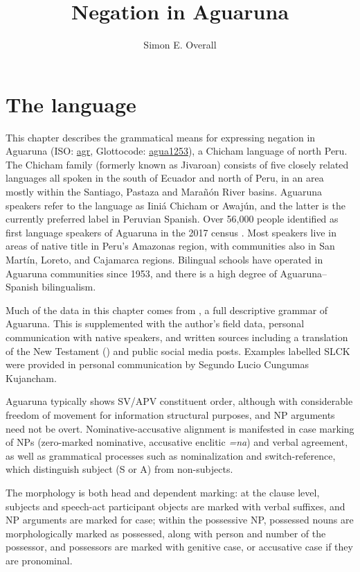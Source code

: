 \documentclass[output=paper,colorlinks,citecolor=brown,draft]{langscibook}
\author{Simon E. Overall\affiliation{University of Otago}}
\title{Negation in Aguaruna}
\begin{document}
\maketitle 

\section{The language}\label{sec:agu:1}

This chapter describes the grammatical means for expressing negation in Agua\-runa (ISO: \href{https://iso639-3.sil.org/code/agr}{agr}, Glottocode: \href{https://glottolog.org/resource/languoid/id/agua1253}{agua1253}), a Chicham language of north Peru. The Chicham family (formerly known as Jivaroan) consists of five closely related languages all spoken in the south of Ecuador and north of Peru, in an area mostly within the Santiago, Pastaza and Marañón River basins. Aguaruna speakers refer to the language as Iiniá Chicham or Awajún, and the latter is the currently preferred label in Peruvian Spanish.
Over 56,000 people identified as first language speakers of Aguaruna in the 2017 census \citep[64]{MinisteriodeEducacióndelPerú2018}. Most speakers live in areas of native title in Peru’s Amazonas region, with communities also in San Martín, Loreto, and Cajamarca regions. Bilingual schools have operated in Aguaruna communities since 1953, and there is a high degree of Aguaruna–Spanish bilingualism.


Much of the data in this chapter comes from \citet{Overall2017a}, a full descriptive grammar of Aguaruna. This is supplemented with the author’s field data, personal communication with native speakers, and written sources including a translation of the New Testament (\citealt{LigaBíblica2008}) and public social media posts.
Examples labelled SLCK were provided in personal communication by Segundo Lucio Cungumas Kujancham. 

Aguaruna typically shows SV/APV constituent order, although with considerable freedom of movement for information structural purposes, and NP arguments need not be overt. Nominative-accusative alignment is manifested in case marking of NPs (zero-marked nominative, accusative enclitic \textit{=na}) and verbal agreement, as well as grammatical processes such as nominalization and switch-reference, which distinguish subject (S or A) from non-subjects.

The morphology is both head and dependent marking: at the clause level, subjects and speech-act participant objects are marked with verbal suffixes, and NP arguments are marked for case; within the possessive NP, possessed nouns are morphologically marked as possessed, along with person and number of the possessor, and possessors are marked with genitive case, or accusative case if they are pronominal.
\end{document}
